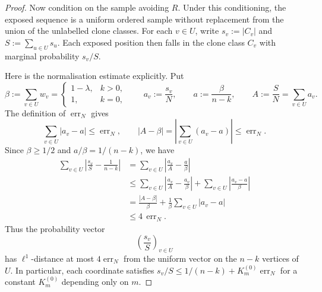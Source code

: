\documentclass[11pt]{article}
\theoremstyle{definition}
\begin{document}
\begin{proof}
Now condition on the sample avoiding $R$.  Under this conditioning, the exposed
sequence is a uniform ordered sample without replacement from the union of the
unlabelled clone classes.  For each $v\in U$, write $s_v:=|C_v|$ and
$S:=\sum_{u\in U}s_u$.  Each exposed position then falls in the clone class
$C_v$ with marginal probability $s_v/S$.

Here is the normalisation estimate explicitly.  Put
\[
  \beta:=\sum_{v\in U}w_v
  =
  \begin{cases}
    1-\lambda,& k>0,\\
    1,& k=0,
  \end{cases}
  \qquad
  a_v:=\frac{s_v}{N},\qquad
  a:=\frac{\beta}{n-k},\qquad
  A:=\frac SN=\sum_{v\in U}a_v .
\]
The definition of $\operatorname{err}_N$ gives
\[
  \sum_{v\in U}
  |a_v-a|
  \le \operatorname{err}_N,
  \qquad
  |A-\beta|
  =
  \left|\sum_{v\in U}(a_v-a)\right|
  \le \operatorname{err}_N .
\]
Since $\beta\ge1/2$ and $a/\beta=1/(n-k)$, we have
\[
\begin{aligned}
  \sum_{v\in U}\left|\frac{s_v}{S}-\frac1{n-k}\right|
  &=
  \sum_{v\in U}\left|\frac{a_v}{A}-\frac{a}{\beta}\right|  \\
  &\le
  \sum_{v\in U}\left|\frac{a_v}{A}-\frac{a_v}{\beta}\right|
  +
  \sum_{v\in U}\left|\frac{a_v-a}{\beta}\right|  \\
  &=
  \frac{|A-\beta|}{\beta}
  +
  \frac1{\beta}\sum_{v\in U}|a_v-a|  \\
  &\le 4\,\operatorname{err}_N .
\end{aligned}
\]
Thus the probability vector
\[
  \left(\frac{s_v}{S}\right)_{v\in U}
\]
has $\ell^1$-distance at most $4\operatorname{err}_N$ from the uniform vector on
the $n-k$ vertices of $U$.  In particular, each coordinate satisfies
$s_v/S\le 1/(n-k)+K_m^{(0)}\operatorname{err}_N$ for a constant
$K_m^{(0)}$ depending only on $m$.


\end{proof}
\end{document}
